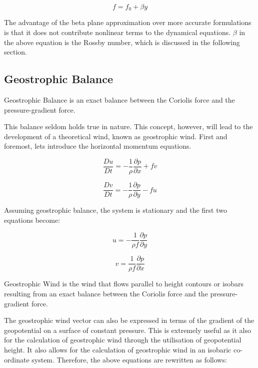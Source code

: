 \begin{equation}
    f = f_0 + \beta y
\end{equation}

The advantage of the beta plane approximation over more accurate formulations is that it does not contribute nonlinear terms to the dynamical equations\cite{beta_approx}. $\beta$ in the above equation is the Rossby number, which is discussed in the following section\cite{rossby_number}.

\subsection{Geostrophic Balance}\label{balance}
\begin{definition}
Geostrophic Balance is an exact balance between the Coriolis force and the pressure-gradient force.
\end{definition}

This balance seldom holds true in nature. This concept, however, will lead to the development of a theoretical wind, known as geostrophic wind. First and foremost, lets introduce the horizontal momentum equations.

\begin{equation}
    \frac{Du}{Dt} = -\frac{1}{\rho}\frac{\partial p}{\partial x} + f v
\end{equation}

\begin{equation}
    \frac{Dv}{Dt} = -\frac{1}{\rho}\frac{\partial p}{\partial y} - f  u
\end{equation}

Assuming geostrophic balance, the system is stationary and the first two equations become:  

\begin{equation}
    u = -\frac{1}{\rho f} \frac{\partial p}{\partial y}
\end{equation}

\begin{equation}
    v = \frac{1}{\rho f} \frac{\partial p}{\partial x}
\end{equation}

\begin{definition}
Geostrophic Wind is the wind that flows parallel to height contours or isobars resulting from an exact balance between the Coriolis force and the pressure-gradient force.
\end{definition}

The geostrophic wind vector can also be expressed in terms of the gradient of the geopotential on a surface of constant pressure. This is extremely useful as it also for the calculation of geostrophic wind through the utilisation of geopotential height. It also allows for the calculation of geostrophic wind in an isobaric co-ordinate system. Therefore, the above equations are rewritten as follows:

